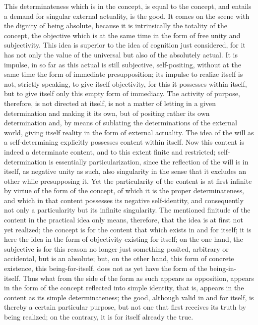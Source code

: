 This determinateness which is in the concept,
is equal to the concept,
and entails a demand for singular external actuality, is the good.
It comes on the scene with the dignity of being absolute,
because it is intrinsically the totality of the concept,
the objective which is at the same time
in the form of free unity and subjectivity.
This idea is superior to the idea of cognition just considered,
for it has not only the value of the universal
but also of the absolutely actual.
It is impulse, in so far as this actual is still
subjective, self-positing, without at the same time the form of immediate
presupposition; its impulse to realize itself is not, strictly speaking, to give
itself objectivity, for this it possesses within itself, but to give itself only
this empty form of immediacy.
The activity of purpose, therefore, is
not directed at itself, is not a matter of letting in a given determination
and making it its own, but of positing rather its own determination and,
by means of sublating the determinations of the external world, giving
itself reality in the form of external actuality.
The idea of the will as a
self-determining explicitly possesses content within itself. Now this content
is indeed a determinate content, and to this extent finite and restricted;
self-determination is essentially particularization, since the reflection of
the will is in itself, as negative unity as such, also singularity in the sense
that it excludes an other while presupposing it. Yet the particularity of the
content is at first infinite by virtue of the form of the concept, of which
it is the proper determinateness, and which in that content possesses its
negative self-identity, and consequently not only a particularity but its
infinite singularity. The mentioned finitude of the content in the practical
idea only means, therefore, that the idea is at first not yet realized; the
concept is for the content that which exists in and for itself; it is here the
idea in the form of objectivity existing for itself; on the one hand, the
subjective is for this reason no longer just something posited, arbitrary or
accidental, but is an absolute; but, on the other hand, this form of concrete
existence, this being-for-itself, does not as yet have the form of the being-in-
itself. Thus what from the side of the form as such appears as opposition,
appears in the form of the concept reflected into simple identity, that is,
appears in the content as its simple determinateness; the good, although
valid in and for itself, is thereby a certain particular purpose, but not one
that first receives its truth by being realized; on the contrary, it is for itself
already the true.

